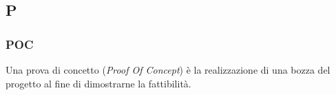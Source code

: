 \subsection{P}

\subsubsection{POC}
Una prova di concetto (\textit{Proof Of Concept}\g) è la realizzazione di una bozza del progetto al fine di dimostrarne la fattibilità.